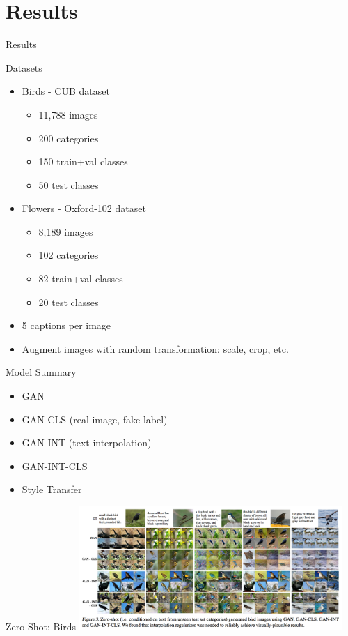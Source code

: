 \documentclass{beamer}
\begin{document}
\section{Results}
\begin{frame}{}
\centering
Results
\end{frame}


\begin{frame}{Datasets}

\begin{itemize} %
\item Birds - CUB dataset
\begin{itemize}
\item 11,788 images
\item 200 categories
\item 150 train+val classes
\item 50 test classes
\end{itemize}

\item Flowers - Oxford-102 dataset
\begin{itemize}
\item 8,189 images
\item 102 categories
\item 82 train+val classes
\item 20 test classes
\end{itemize}

\item 5 captions per image
\item Augment images with random transformation: scale, crop, etc.

\end{itemize} %

\end{frame}


\begin{frame}{Model Summary}
\begin{itemize}
\item GAN
\item GAN-CLS (real image, fake label)
\item GAN-INT (text interpolation)
\item GAN-INT-CLS
\item Style Transfer
\end{itemize}
\end{frame}


\begin{frame}{Zero Shot: Birds}
\centering
\includegraphics[width=10cm]{img/reed/zero_shot_birds.png}
\end{frame}
\end{document}
